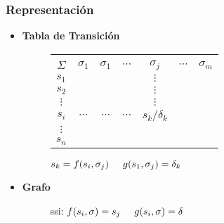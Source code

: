 \subsubsection{Representación}
\begin{itemize}
\item \textbf{Tabla de Transición} \\
\begin{figure}[h]
\centering
\begin{tabular}{|c|cccccc|}
    \hline
    \backslashbox{$k$}{\vspace{0.1pt}\\$\Sigma$} & $\sigma_1$ & $\sigma_1$ & $\cdots$ & $\sigma_j$ & $\cdots$ & $\sigma_m$\\ \hline
                $s_1$             &      &  &   &$\vdots$&&\\ 
                $s_2$             &      &  &  &$\vdots$&& \\ 
                $\vdots$             &      & &  & $\vdots$ &&\\ 
                $s_i$             &   $\cdots$   & $\cdots$  &$\cdots$  &$s_k/\delta_k$&&\\ 
                $\vdots$             &      &  &  &&& \\ 
                $s_n$             &      &  &  && &\\ \hline
\end{tabular} 
\caption{$s_k = f(s_i,\sigma_j)\hspace{0.5cm}g(s_1,\sigma_j)=\delta_k$}
\end{figure}
\item \textbf{Grafo} \\

\begin{figure}[h]
\centering
{}
\caption{ssi: $f(s_i,\sigma)=s_j \hspace{0.5cm} g(s_i,\sigma)=\delta$ }
\end{figure}
\end{itemize}
